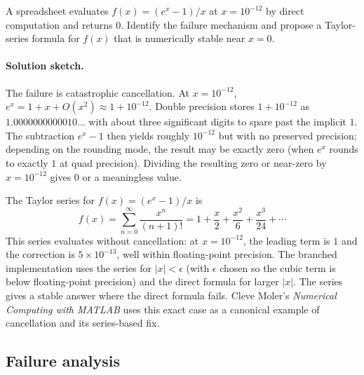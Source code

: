 \begin{exercise}
A spreadsheet evaluates $f(x) = (e^{x} - 1)/x$ at $x = 10^{-12}$ by
direct computation and returns $0$. Identify the failure mechanism
and propose a Taylor-series formula for $f(x)$ that is numerically
stable near $x = 0$.

\paragraph{Solution sketch.} The failure is catastrophic
cancellation. At $x = 10^{-12}$, $e^{x} = 1 + x + O(x^{2})
\approx 1 + 10^{-12}$. Double precision stores $1 + 10^{-12}$ as
$1.0000000000010 \ldots$ with about three significant digits to
spare past the implicit $1$. The subtraction $e^{x} - 1$ then yields
roughly $10^{-12}$ but with no preserved precision; depending on the
rounding mode, the result may be exactly zero (when $e^{x}$ rounds
to exactly $1$ at quad precision). Dividing the resulting zero or
near-zero by $x = 10^{-12}$ gives $0$ or a meaningless value.

The Taylor series for $f(x) = (e^{x} - 1)/x$ is
\[
f(x) = \sum_{n=0}^{\infty} \frac{x^{n}}{(n+1)!} = 1 + \frac{x}{2} +
\frac{x^{2}}{6} + \frac{x^{3}}{24} + \cdots
\]
This series evaluates without cancellation: at $x = 10^{-12}$, the
leading term is $1$ and the correction is $5 \times 10^{-13}$, well
within floating-point precision. The branched implementation uses
the series for $|x| < \epsilon$ (with $\epsilon$ chosen so the cubic
term is below floating-point precision) and the direct formula for
larger $|x|$. The series gives a stable answer where the direct
formula fails. Cleve Moler's \emph{Numerical Computing with
MATLAB} \cite{text:moler-numerical} uses this exact case as a
canonical example of cancellation and its series-based fix.
\end{exercise}

\subsection*{Failure analysis}

